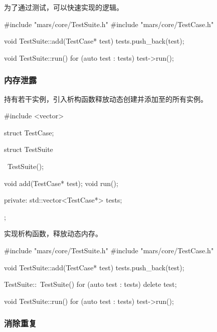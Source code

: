 \begin{content}
为了通过测试，可以快速实现的逻辑。

\begin{leftbar}
 \begin{c++}[caption={\ttfamily{src/mars/core/TestSuite.cc}}]
#include "mars/core/TestSuite.h"
#include "mars/core/TestCase.h"

void TestSuite::add(TestCase* test) {
  tests.push_back(test);
}

void TestSuite::run() {
  for (auto test : tests) {
    test->run();
  }
}
 \end{c++}
\end{leftbar}

\subsubsection{内存泄露}

持有若干实例，引入析构函数释放动态创建并添加至的所有实例。

\begin{leftbar}
 \begin{c++}[caption={\ttfamily{include/mars/core/TestSuite.h}}]
#include <vector>

struct TestCase;

struct TestSuite {
  ~TestSuite();

  void add(TestCase* test);
  void run();

private:
  std::vector<TestCase*> tests;
};
 \end{c++}
\end{leftbar}

实现析构函数，释放动态内存。

\begin{leftbar}
 \begin{c++}[caption={\ttfamily{src/mars/core/TestSuite.cc}}]
#include "mars/core/TestSuite.h"
#include "mars/core/TestCase.h"

void TestSuite::add(TestCase* test) {
  tests.push_back(test);
}

TestSuite::~TestSuite() {
  for (auto test : tests) {
    delete test;
  }
}

void TestSuite::run() {
  for (auto test : tests) {
    test->run();
  }
}
 \end{c++}
\end{leftbar}

\subsubsection{消除重复}


\end{content}
